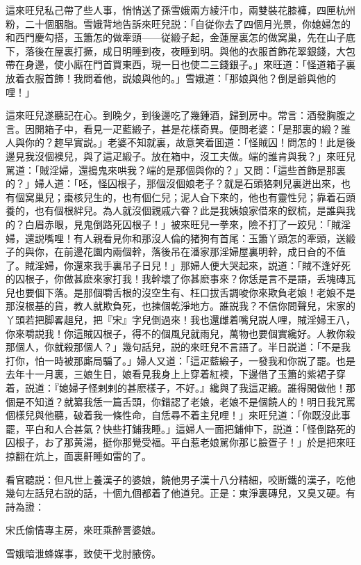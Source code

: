 這來旺兒私己帶了些人事，悄悄送了孫雪娥兩方綾汗巾，兩雙裝花膝褲，四匣杭州粉，二十個胭脂。雪娥背地告訴來旺兒説：「自従你去了四個月光景，你媳婦怎的和西門慶勾搭，玉簫怎的做牽頭——従緞子起，金蓮屋裏怎的做窝巢，先在山子底下，落後在屋裏打撅，成日明睡到夜，夜睡到明。與他的衣服首飾花翠銀錢，大包帶在身邊，使小廝在門首買東西，現一日也使二三錢銀子。」來旺道：「怪道箱子裏放着衣服首飾！我問着他，説娘與他的。」雪娥道：「那娘與他？倒是爺與他的哩！」

這來旺兒遂聽記在心。到晚夕，到後邊吃了幾鍾酒，歸到房中。常言：酒發胸腹之言。因開箱子中，看見一疋藍緞子，甚是花樣奇異。便問老婆：「是那裏的緞？誰人與你的？趂早實説。」老婆不知就裏，故意笑着囬道：「怪賊囚！問怎的！此是後邊見我沒個襖兒，與了這疋緞子。放在箱中，沒工夫做。端的誰肯與我？」來旺兒駡道：「賊淫婦，還搗鬼來哄我？端的是那個與你的？」又問：「這些首飾是那裏的？」婦人道：「呸，怪囚根子，那個沒個娘老子？就是石頭狢剌兒裏迸出來，也有個窝巢兒；棗核兒生的，也有個仁兒；泥人㒲下來的，他也有靈性兒；靠着石頭養的，也有個根絆兒。為人就沒個親戚六眷？此是我姨娘家借來的釵梳，是誰與我的？白眉赤眼，見鬼倒路死囚根子！」被來旺兒一拳來，險不打了一跤兒：「賊淫婦，還説嘴哩！有人親看見你和那沒人倫的猪狗有首尾：玉簫丫頭怎的牽頭，送緞子的與你，在前邊花園内兩個幹，落後吊在潘家那淫婦屋裏明幹，成日㒲的不值了。賊淫婦，你還來我手裏吊子日兒！」那婦人便大哭起來，説道：「賊不逢好死的囚根子，你做甚麽來家打我！我幹壞了你甚麽事來？你恁是言不是語，丢塊磚瓦兒也要個下落。是那個嚼舌根的沒空生有、枉口拔舌調唆你來欺負老娘！老娘不是那沒根基的貨，教人就欺負死，也揀個乾淨地方。誰説我？不信你問聲兒，宋家的丫頭若把脚畧趄兒，把『宋』字兒倒過來！我也還雌着嘴兒説人哩，賊淫婦王八，你來嚼説我！你這賊囚根子，得不的個風兒就雨兒，萬物也要個實纔好。人教你殺那個人，你就殺那個人？」幾句話兒，説的來旺兒不言語了。半日説道：「不是我打你，怕一時被那廝局騙了。」婦人又道：「這疋藍緞子，一發我和你説了罷。也是去年十一月裏，三娘生日，娘看見我身上上穿着紅襖，下邊借了玉簫的紫裙子穿着，説道：『媳婦子怪剌剌的甚麽樣子，不好。』纔與了我這疋緞。誰得閑做他！那個是不知道？就纂我恁一篇舌頭，你錯認了老娘，老娘不是個饒人的！明日我咒罵個樣兒與他聽，破着我一條性命，自恁尋不着主兒哩！」來旺兒道：「你既沒此事罷，平白和人合甚氣？快些打鋪我睡。」這婦人一面把鋪伸下，説道：「怪倒路死的囚根子，お了那黄湯，挺你那覺受福。平白惹老娘駡你那じ臉疍子！」於是把來旺掠翻在炕上，面裏鼾睡如雷的了。

看官聽説：但凡世上養漢子的婆娘，饒他男子漢十八分精細，咬断鐵的漢子，吃他幾句左話兒右説的話，十個九個都着了他道兒。正是：東淨裏磚兒，又臭又硬。有詩為證：

\begin{myquote}
宋氏偷情專主房，來旺乘醉詈婆娘。

雪娥暗泄蜂媒事，致使干戈肘腋傍。
\end{myquote}

